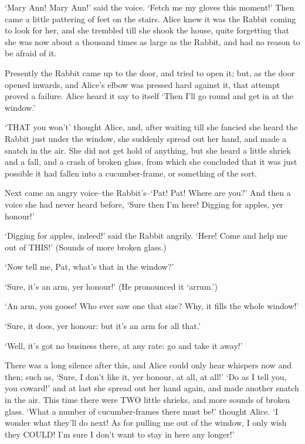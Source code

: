 \documentclass[12pt]{book}
\begin{document}
  `Mary Ann!  Mary Ann!' said the voice.  `Fetch me my gloves
this moment!'  Then came a little pattering of feet on the
stairs.  Alice knew it was the Rabbit coming to look for her, and
she trembled till she shook the house, quite forgetting that she
was now about a thousand times as large as the Rabbit, and had no
reason to be afraid of it.

  Presently the Rabbit came up to the door, and tried to open it;
but, as the door opened inwards, and Alice's elbow was pressed
hard against it, that attempt proved a failure.  Alice heard it
say to itself `Then I'll go round and get in at the window.'

  `THAT you won't' thought Alice, and, after waiting till she
fancied she heard the Rabbit just under the window, she suddenly
spread out her hand, and made a snatch in the air.  She did not
get hold of anything, but she heard a little shriek and a fall,
and a crash of broken glass, from which she concluded that it was
just possible it had fallen into a cucumber-frame, or something
of the sort.

  Next came an angry voice--the Rabbit's--`Pat! Pat!  Where are
you?'  And then a voice she had never heard before, `Sure then
I'm here!  Digging for apples, yer honour!'

  `Digging for apples, indeed!' said the Rabbit angrily.  `Here!
Come and help me out of THIS!'  (Sounds of more broken glass.)

  `Now tell me, Pat, what's that in the window?'

  `Sure, it's an arm, yer honour!'  (He pronounced it `arrum.')

  `An arm, you goose!   Who ever saw one that size?  Why, it
fills the whole window!'

  `Sure, it does, yer honour:  but it's an arm for all that.'

  `Well, it's got no business there, at any rate:  go and take it
away!'

  There was a long silence after this, and Alice could only hear
whispers now and then; such as, `Sure, I don't like it, yer
honour, at all, at all!'  `Do as I tell you, you coward!' and at
last she spread out her hand again, and made another snatch in
the air.  This time there were TWO little shrieks, and more
sounds of broken glass.  `What a number of cucumber-frames there
must be!' thought Alice.  `I wonder what they'll do next!  As for
pulling me out of the window, I only wish they COULD!  I'm sure I
don't want to stay in here any longer!'
\end{document}
